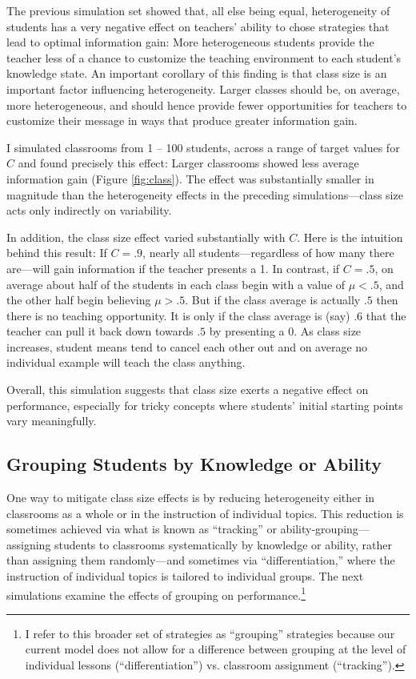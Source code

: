 \documentclass[10pt,letterpaper]{article}
\begin{document}
The previous simulation set showed that, all else being equal, heterogeneity of students has a very negative effect on teachers' ability to chose strategies that lead to optimal information gain: More heterogeneous students provide the teacher less of a chance to customize the teaching environment to each student's knowledge state. An important corollary of this finding is that class size is an important factor influencing heterogeneity. Larger classes should be, on average, more heterogeneous, and should hence provide fewer opportunities for teachers to customize their message in ways that produce greater information gain.

I simulated classrooms from 1 -- 100 students, across a range of target values for $C$ and found precisely this effect: Larger classrooms showed less average information gain (Figure \ref{fig:class}). The  effect was substantially smaller in magnitude than the heterogeneity effects in the preceding simulations---class size acts only indirectly on variability. 

In addition, the class size effect varied substantially with $C$. Here is the intuition behind this result: If $C=.9$, nearly all students---regardless of how many there are---will gain information if the teacher presents a 1. In contrast, if $C=.5$, on average about half of the students in each class begin with a value of $\mu < .5$, and the other half begin believing $\mu > .5$. But if the class average is actually $.5$ then there is no teaching opportunity. It is only if the class average is (say) $.6$ that the teacher can pull it back down towards $.5$ by presenting a 0. As class size increases, student means tend to cancel each other out and  on average no individual example will teach the class anything. 

Overall, this simulation suggests that class size exerts a negative effect on performance, especially for tricky concepts where students' initial starting points vary meaningfully. 

\subsection{Grouping Students by Knowledge or Ability}



One way to mitigate class size effects is by reducing heterogeneity either in classrooms as a whole or in the instruction of individual topics. This reduction is sometimes achieved via what is known as ``tracking'' or ability-grouping---assigning students to classrooms systematically by knowledge or ability, rather than assigning them randomly---and sometimes via ``differentiation,'' where the instruction of individual topics is tailored to individual groups. The next simulations examine the effects of grouping on performance.\footnote{I refer to this broader set of strategies as ``grouping'' strategies because our current model does not allow for a difference between grouping at the level of individual lessons (``differentiation'') vs. classroom assignment (``tracking'').} 
\end{document}
